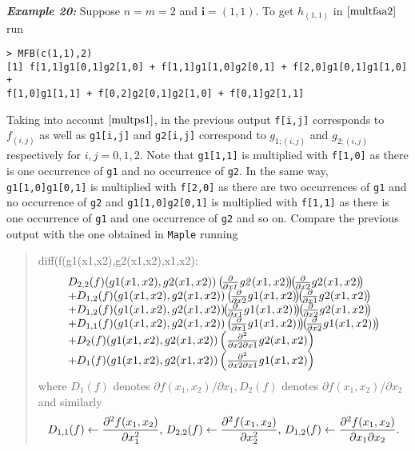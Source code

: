 \hskip-0.5cm\textbf{\emph{Example 20:}} Suppose \(n=m=2\) and
\(\boldsymbol{i}=(1,1).\) To get \(h_{(1,1)}\) in \(\eqref{multfaa2}\)
run

\begin{verbatim}
> MFB(c(1,1),2)
[1] f[1,1]g1[0,1]g2[1,0] + f[1,1]g1[1,0]g2[0,1] + f[2,0]g1[0,1]g1[1,0] + 
f[1,0]g1[1,1] + f[0,2]g2[0,1]g2[1,0] + f[0,1]g2[1,1]
\end{verbatim}

Taking into account \(\eqref{multps1}\), in the previous output
\texttt{f{[}i,j{]}} corresponds to \(f_{(i,j)}\) as well as
\texttt{g1{[}i,j{]}} and \texttt{g2{[}i,j{]}} correspond to
\(g_{1;(i,j)}\) and \(g_{2;(i,j)}\) respectively for \(i,j=0,1,2.\) Note
that \texttt{g1{[}1,1{]}} is multiplied with \texttt{f{[}1,0{]}} as
there is one occurrence of \texttt{g1} and no occurrence of \texttt{g2}.
In the same way, \texttt{g1{[}1,0{]}g1{[}0,1{]}} is multiplied with
\texttt{f{[}2,0{]}} as there are two occurrences of \texttt{g1} and no
occurrence of \texttt{g2} and \texttt{g1{[}1,0{]}g2{[}0,1{]}} is
multiplied with \texttt{f{[}1,1{]}} as there is one occurrence of
\texttt{g1} and one occurrence of \texttt{g2} and so on. Compare the
previous output with the one obtained in \texttt{Maple} running

\begin{quote}
diff(f(g1(x1,x2),g2(x1,x2),x1,x2): \[
\begin{array}{l}
D_{{2,2}}(f)(g1(x1,x2), g2(x1,x2))  \left(\!{\frac {\partial }{\partial {\it x1}}}{\it g2}(x1,x2)\!\right)\!\! \left(\!{\frac {\partial }{\partial x2}} g2(x1,x2)\!\right) \\ + D_{{1,2}}(f)(g1(x1,x2),g2(x1,x2)) \left(\!{\frac {\partial }{\partial x2}}g1(x1,x2)\!\right)\!\! 
\left(\!{\frac {\partial }{\partial x1}}g2(x1,x2)\!\right) \\
+ D_{1,2}(f)(g1(x1,x2),g2(x1,x2)) \!\! 
\left(\!{\frac {\partial }{\partial x1}}g1(x1,x2))\!\right) \!\!
\left(\!{\frac {\partial }{\partial x2}}g2(x1,x2)\!\right) \\
+ D_{{1,1}}(f)(g1(x1,x2), g2(x1,x2))
\left(\! {\frac {\partial}{\partial x1}}g1(x1,x2))\!\right)\!\!
\left(\!{\frac {\partial }{\partial x2}}g1(x1,x2))\!\right) \\
+ D_{{2}}(f)(g1(x1,x2), g2(x1,x2)) 
\left({\frac {\partial^{2}}{\partial x2 \partial x1}}g2(x1,x2)\right)\\
+ D_{{1}}(f)(g1(x1,x2),g2(x1,x2)) \left({\frac {\partial^{2}}{\partial x2 \partial x1}} g1(x1,x2)\right)
\end{array}\] where \(D_{1}(f)\) denotes
\(\partial f(x_1,x_2)/\partial x_1, D_{2}(f)\) denotes
\(\partial f(x_1,x_2)/\partial x_2\) and similarly
\[{\small D_{1,1}(f) \leftarrow  \frac{\partial^2 f(x_1,x_2)}{\partial x_1^2}, \, D_{2,2}(f) \leftarrow  \frac{\partial^2 f(x_1,x_2)}{\partial x_2^2}, \, D_{1,2}(f) \leftarrow \frac{\partial^2 f(x_1,x_2)}{\partial x_1 \partial x_2}}.\]
\end{quote}

